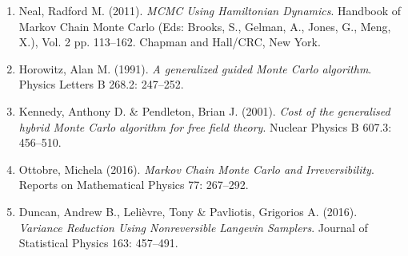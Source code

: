 \begin{talk}
\medskip

\begin{enumerate}
 \item[{[1]}] Neal, Radford M. (2011). {\it MCMC Using Hamiltonian Dynamics}. Handbook of Markov Chain Monte Carlo (Eds: Brooks, S., Gelman, A., Jones, G., Meng, X.), Vol. 2 pp. 113--162. Chapman and Hall/CRC, New York.
 \item[{[2]}] Horowitz, Alan M. (1991). {\it A generalized guided Monte Carlo algorithm}. Physics Letters B 268.2: 247--252. 
 \item[{[3]}] Kennedy, Anthony D. \& Pendleton, Brian J. (2001). {\it Cost of the generalised hybrid Monte Carlo algorithm for free field theory}. Nuclear Physics B 607.3: 456--510.
 \item[{[4]}] Ottobre, Michela (2016). {\it Markov Chain Monte Carlo and Irreversibility}. Reports on Mathematical Physics 77: 267--292.
 \item[{[5]}] Duncan, Andrew B., Leli\`evre, Tony \& Pavliotis, Grigorios A. (2016). {\it Variance Reduction Using Nonreversible Langevin Samplers}. Journal of Statistical Physics 163: 457--491. 
\end{enumerate}

\end{talk}

